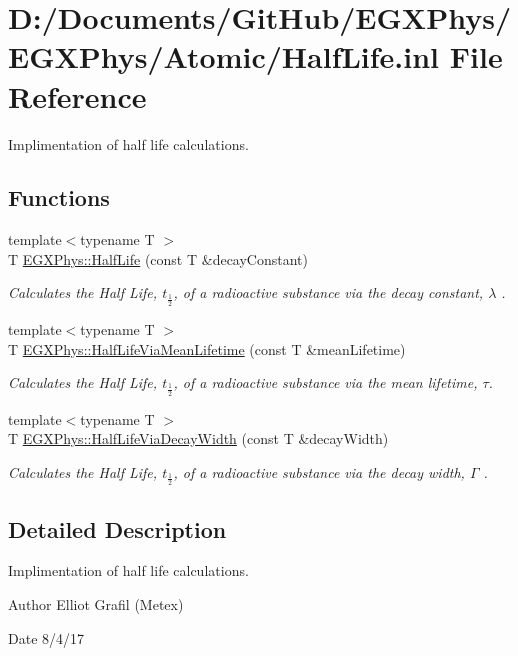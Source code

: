 \hypertarget{_half_life_8inl}{}\section{D\+:/\+Documents/\+Git\+Hub/\+E\+G\+X\+Phys/\+E\+G\+X\+Phys/\+Atomic/\+Half\+Life.inl File Reference}
\label{_half_life_8inl}


Implimentation of half life calculations.  


\subsection*{Functions}
\begin{DoxyCompactItemize}
\item 
{\footnotesize template$<$typename T $>$ }\\T \hyperlink{group___e_g_x_phys-_half_life_ga21d268f154fb91c1c556bbfa7fe83ac1}{E\+G\+X\+Phys\+::\+Half\+Life} (const T \&decay\+Constant)
\begin{DoxyCompactList}\small\item\em Calculates the Half Life, $t_{\frac{1}{2}}$, of a radioactive substance via the decay constant, $\lambda$ . \end{DoxyCompactList}\item 
{\footnotesize template$<$typename T $>$ }\\T \hyperlink{group___e_g_x_phys-_half_life_gacddef16b62e98b214ec8dd8af7da7dce}{E\+G\+X\+Phys\+::\+Half\+Life\+Via\+Mean\+Lifetime} (const T \&mean\+Lifetime)
\begin{DoxyCompactList}\small\item\em Calculates the Half Life, $t_{\frac{1}{2}}$, of a radioactive substance via the mean lifetime, $\tau$. \end{DoxyCompactList}\item 
{\footnotesize template$<$typename T $>$ }\\T \hyperlink{group___e_g_x_phys-_half_life_gaba3fda944d1a68ee1016a1f2f5809359}{E\+G\+X\+Phys\+::\+Half\+Life\+Via\+Decay\+Width} (const T \&decay\+Width)
\begin{DoxyCompactList}\small\item\em Calculates the Half Life, $t_{\frac{1}{2}}$, of a radioactive substance via the decay width, $\Gamma$ . \end{DoxyCompactList}\end{DoxyCompactItemize}


\subsection{Detailed Description}
Implimentation of half life calculations. 

\begin{DoxyAuthor}{Author}
Elliot Grafil (Metex) 
\end{DoxyAuthor}
\begin{DoxyDate}{Date}
8/4/17 
\end{DoxyDate}

